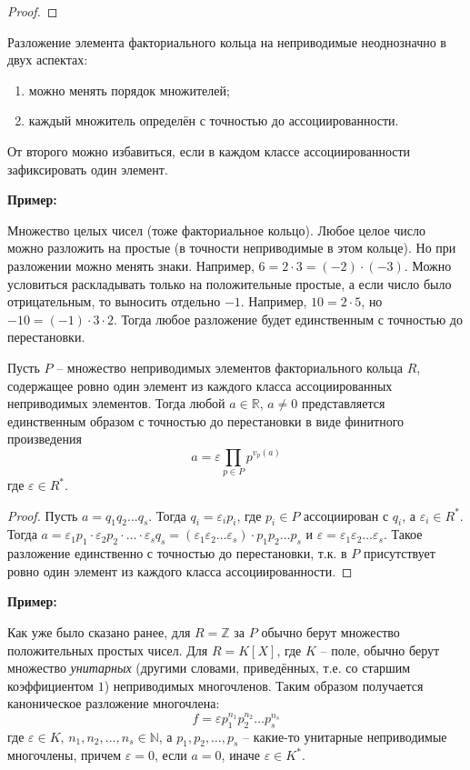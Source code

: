 \begin{normalsize}
\begin{proof}
\end{proof}

Разложение элемента факториального кольца на неприводимые
неоднозначно в двух аспектах:
\begin{enumerate}
    \item можно менять порядок множителей;
    \item каждый множитель определён с точностью до ассоциированности.
\end{enumerate}
От второго можно избавиться, если в каждом классе ассоциированности
зафиксировать один элемент.

\textbf{Пример:}

Множество целых чисел (тоже факториальное кольцо). Любое целое число 
можно разложить на простые (в точности неприводимые в этом кольце).
Но при разложении можно менять знаки. Например, $6 = 2 \cdot 3 =
(-2) \cdot (-3)$. Можно условиться раскладывать только на положительные
простые, а если число было отрицательным, то выносить отдельно $-1$.
Например, $10 = 2 \cdot 5$, но $-10 = (-1) \cdot 3 \cdot 2$.
Тогда любое разложение будет единственным с точностью до перестановки.

\begin{theorem-non}
Пусть $P$ -- множество неприводимых элементов факториального кольца $R$,
содержащее ровно один элемент из каждого класса ассоциированных
неприводимых элементов. Тогда любой $a \in \mathbb{R}$, $a \neq 0$ 
представляется единственным образом с точностью до перестановки в виде 
финитного произведения
\[a = \varepsilon \prod_{p \in P} p^{v_p(a)}\]
где $\varepsilon \in R^*$.
\end{theorem-non}
\begin{proof}
Пусть $a = q_1 q_2 ... q_s$. Тогда $q_i = \varepsilon_i p_i$, где
$p_i \in P$ ассоциирован с $q_i$, а $\varepsilon_i \in R^*$. Тогда
$a = \varepsilon_1 p_1 \cdot \varepsilon_2 p_2 \cdot \dots \cdot 
\varepsilon_s q_s = (\varepsilon_1 \varepsilon_2 \dots \varepsilon_s) 
\cdot p_1 p_2 \dots p_s$ и $\varepsilon = \varepsilon_1 \varepsilon_2 
\dots \varepsilon_s$. Такое разложение единственно с точностью до
перестановки, т.к. в $P$ присутствует ровно один элемент из каждого
класса ассоциированности.
\end{proof}

\textbf{Пример:}

Как уже было сказано ранее, для $R = \mathbb{Z}$ за $P$ обычно берут
множество положительных простых чисел. Для $R = K[X]$, где $K$ -- поле,
обычно берут множество \textit{унитарных} (другими словами, приведённых, 
т.е. со старшим коэффициентом $1$) неприводимых многочленов. Таким
образом получается каноническое разложение многочлена:
\[f = \varepsilon p_1^{n_1} p_2^{n_2} \dots p_s^{n_s}\]
где $\varepsilon \in K$, $n_1, n_2, \dots, n_s \in \mathbb{N}$, а 
$p_1, p_2, \dots, p_s$ -- какие-то унитарные неприводимые многочлены,
причем $\varepsilon = 0$, если $a = 0$, иначе $\varepsilon \in K^*$.


\end{normalsize}